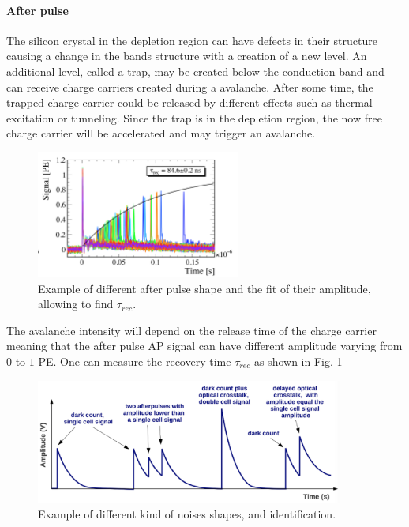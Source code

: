 \paragraph{After pulse}
The silicon crystal in the depletion region can have defects in their structure causing a change in the bands structure with a creation of a new level. An additional level, called a trap, may be created below the conduction band and can receive charge carriers created during a avalanche. After some time, the trapped charge carrier could be released by different effects such as thermal excitation or tunneling. Since the trap is in the depletion region, the now free charge carrier will be accelerated and may trigger an avalanche. 
\begin{figure}[htbp]
    \centering
    \includegraphics[width=0.6\textwidth]{gfx/documentation/afterpulse_example.png}
    \caption{Example of different after pulse shape and the fit of their amplitude, allowing to find $\tau_{rec}$. 
    \cite{Girard2018CharacterisationDistributions}}
  \label{fig:chapter02:Sources of noise: after pulse signal ex}
\end{figure}
The avalanche intensity will depend on the release time of the charge carrier meaning that the after pulse \ac{AP} signal can have different amplitude varying from $0$ to $1$ \ac{PE}. One can measure the recovery time $\tau_{rec}$ as shown in Fig. \ref{fig:chapter02:Sources of noise: after pulse signal ex}

\begin{figure}[htbp]
    \centering
    \includegraphics[width=0.9\textwidth]{gfx/documentation/noise_shapes.png}
    \caption{Example of different kind of noises shapes, and identification. 
    \cite{Gundacker2020TheDetector}
    }
    \label{fig:chapter02:Sources of noise}
\end{figure}

